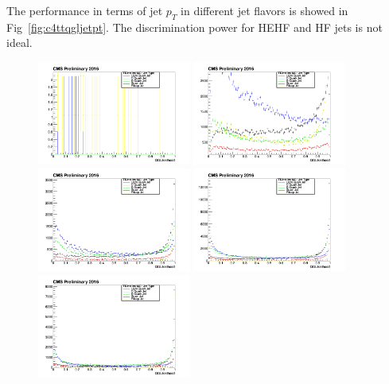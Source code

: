 The performance in terms of jet $p_{T}$ in different jet flavors is showed in Fig~\ref{fig:c4ttqgljetpt}. The discrimination power for HEHF and HF jets is not ideal.
\begin{figure}[htbp]
 \begin{center}
  \includegraphics[width=0.45\textwidth]{sections/mc4/TopTagger/figures/_b_qglikelihoodjetptbin0_.png}
  \includegraphics[width=0.45\textwidth]{sections/mc4/TopTagger/figures/_b_qglikelihoodjetptbin1_.png} \\
  \includegraphics[width=0.45\textwidth]{sections/mc4/TopTagger/figures/_b_qglikelihoodjetptbin2_.png} 
  \includegraphics[width=0.45\textwidth]{sections/mc4/TopTagger/figures/_b_qglikelihoodjetptbin3_.png} \\
  \includegraphics[width=0.45\textwidth]{sections/mc4/TopTagger/figures/_b_qglikelihoodjetptbin4_.png}

\end{center}
\end{figure}
